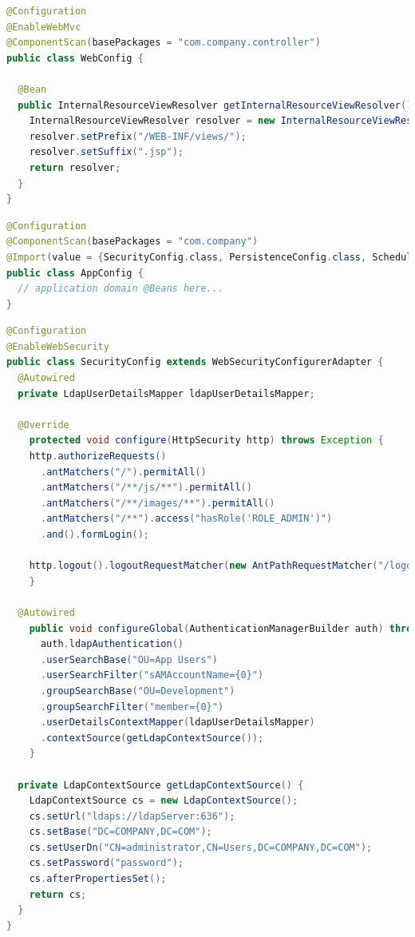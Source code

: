 \begin{lstlisting}[language=java, title=WebConfig.java]
@Configuration
@EnableWebMvc
@ComponentScan(basePackages = "com.company.controller")
public class WebConfig {

  @Bean
  public InternalResourceViewResolver getInternalResourceViewResolver() {
    InternalResourceViewResolver resolver = new InternalResourceViewResolver();
    resolver.setPrefix("/WEB-INF/views/");
    resolver.setSuffix(".jsp");
    return resolver;
  }
}
\end{lstlisting}


\begin{lstlisting}[language=java, title=AppConfig.java]
@Configuration
@ComponentScan(basePackages = "com.company")
@Import(value = {SecurityConfig.class, PersistenceConfig.class, ScheduleConfig.class})
public class AppConfig {
  // application domain @Beans here...
}
\end{lstlisting}


\begin{lstlisting}[language=java, title=Security.java]
@Configuration
@EnableWebSecurity
public class SecurityConfig extends WebSecurityConfigurerAdapter {
  @Autowired
  private LdapUserDetailsMapper ldapUserDetailsMapper;

  @Override
    protected void configure(HttpSecurity http) throws Exception {
    http.authorizeRequests()
      .antMatchers("/").permitAll()
      .antMatchers("/**/js/**").permitAll()
      .antMatchers("/**/images/**").permitAll()
      .antMatchers("/**").access("hasRole('ROLE_ADMIN')")
      .and().formLogin();

    http.logout().logoutRequestMatcher(new AntPathRequestMatcher("/logout"));
    }

  @Autowired
    public void configureGlobal(AuthenticationManagerBuilder auth) throws Exception {
      auth.ldapAuthentication()
      .userSearchBase("OU=App Users")
      .userSearchFilter("sAMAccountName={0}")
      .groupSearchBase("OU=Development")
      .groupSearchFilter("member={0}")
      .userDetailsContextMapper(ldapUserDetailsMapper)
      .contextSource(getLdapContextSource());
    }

  private LdapContextSource getLdapContextSource() {
    LdapContextSource cs = new LdapContextSource();
    cs.setUrl("ldaps://ldapServer:636");
    cs.setBase("DC=COMPANY,DC=COM");
    cs.setUserDn("CN=administrator,CN=Users,DC=COMPANY,DC=COM");
    cs.setPassword("password");
    cs.afterPropertiesSet();
    return cs;
  }
}
\end{lstlisting}


